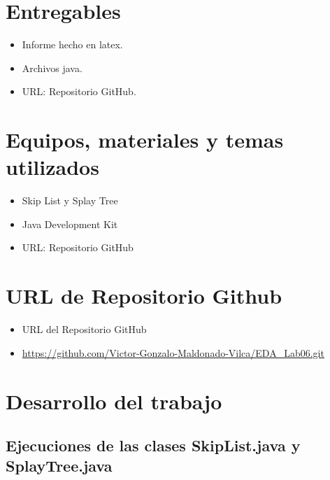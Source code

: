 \documentclass{article}
\begin{document}
  \section{Entregables}
  \begin{itemize}
    \item Informe hecho en latex.
    \item Archivos java.
    \item URL: Repositorio GitHub.
  \end{itemize}
  
		
	\section{Equipos, materiales y temas utilizados}
  \begin{itemize}
    \item Skip List y Splay Tree
    \item Java Development Kit
    \item URL: Repositorio GitHub
  \end{itemize}
  

	\section{URL de Repositorio Github}
  \begin{itemize}
    \item URL del Repositorio GitHub
    \item \url{https://github.com/Victor-Gonzalo-Maldonado-Vilca/EDA_Lab06.git}
  \end{itemize}


	\section{Desarrollo del trabajo}
  

  \subsection{Ejecuciones de las clases SkipList.java y SplayTree.java}
  
\end{document}

